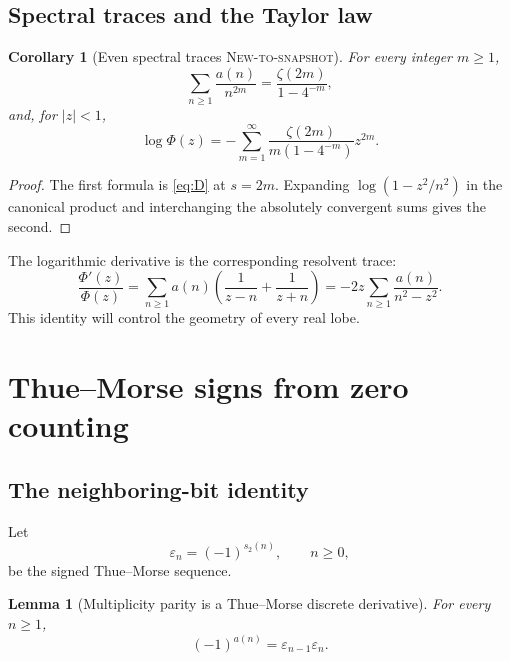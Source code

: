 \documentclass[11pt,oneside]{article}
\numberwithin{equation}{section}
\newtheorem{lemma}[theorem]{Lemma}
\newtheorem{corollary}[theorem]{Corollary}
\theoremstyle{definition}
\theoremstyle{remark}
\newcommand{\NewResult}{\textsc{New-to-snapshot}}
\begin{document}
\subsection{Spectral traces and the Taylor law}

\begin{corollary}[Even spectral traces \NewResult]
\label{cor:traces}
For every integer $m\ge1$,
\begin{equation}
 \sum_{n\ge1}\frac{a(n)}{n^{2m}}
 =\frac{\zeta(2m)}{1-4^{-m}},                              \label{eq:trace}
\end{equation}
and, for $|z|<1$,
\begin{equation}
 \log\Phi(z)
 =-\sum_{m=1}^{\infty}
 \frac{\zeta(2m)}{m(1-4^{-m})}z^{2m}.                    \label{eq:log-taylor}
\end{equation}
\end{corollary}

\begin{proof}
The first formula is \eqref{eq:D} at $s=2m$.  Expanding
$\log(1-z^2/n^2)$ in the canonical product and interchanging the absolutely
convergent sums gives the second.
\end{proof}

The logarithmic derivative is the corresponding resolvent trace:
\begin{equation}
 \frac{\Phi'(z)}{\Phi(z)}
 =\sum_{n\ge1}a(n)\left(\frac1{z-n}+\frac1{z+n}\right)
 =-2z\sum_{n\ge1}\frac{a(n)}{n^2-z^2}.                   \label{eq:logder}
\end{equation}
This identity will control the geometry of every real lobe.

\section{Thue--Morse signs from zero counting}
\label{sec:signs}

\subsection{The neighboring-bit identity}

Let
\begin{equation}
 \varepsilon_n=(-1)^{s_2(n)},\qquad n\ge0,                 \label{eq:eps}
\end{equation}
be the signed Thue--Morse sequence.

\begin{lemma}[Multiplicity parity is a Thue--Morse discrete derivative]
\label{lem:parity}
For every $n\ge1$,
\begin{equation}
 (-1)^{a(n)}=\varepsilon_{n-1}\varepsilon_n.              \label{eq:neighbor}
\end{equation}
\end{lemma}
\end{document}
